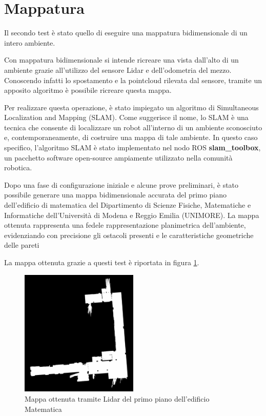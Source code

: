 \section{Mappatura}
Il secondo test è stato quello di eseguire una mappatura bidimensionale di un intero ambiente.

\noindent Con mappatura bidimensionale si intende ricreare una vista dall'alto di un ambiente grazie all'utilizzo del sensore Lidar e dell'odometria del mezzo. Conoscendo infatti lo spostamento e la pointcloud rilevata dal sensore, tramite un apposito algoritmo è possibile ricreare questa mappa.

\noindent Per realizzare questa operazione, è stato impiegato un algoritmo di Simultaneous Localization and Mapping (SLAM). Come suggerisce il nome, lo SLAM è una tecnica che consente di localizzare un robot all'interno di un ambiente sconosciuto e, contemporaneamente, di costruire una mappa di tale ambiente. In questo caso specifico, l'algoritmo SLAM è stato implementato nel nodo ROS \textbf{slam\_toolbox}, un pacchetto software open-source ampiamente utilizzato nella comunità robotica.

\noindent Dopo una fase di configurazione iniziale e alcune prove preliminari, è stato possibile generare una mappa bidimensionale accurata del primo piano dell'edificio di matematica del Dipartimento di Scienze Fisiche, Matematiche e Informatiche dell'Università di Modena e Reggio Emilia (UNIMORE). La mappa ottenuta rappresenta una fedele rappresentazione planimetrica dell'ambiente, evidenziando con precisione gli ostacoli presenti e le caratteristiche geometriche delle pareti

\noindent La mappa ottenuta grazie a questi test è riportata in figura \ref{franco_map}.

\begin{figure}[H]
  \centering
  \includegraphics[width=0.5\textwidth]{figures/franco_map.png}
  \caption{Mappa ottenuta tramite Lidar del primo piano dell'edificio Matematica}
  \label{franco_map}
\end{figure}

